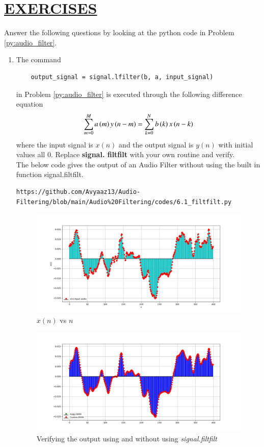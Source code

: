 \documentclass[journal,12pt,twocolumn]{IEEEtran}
\theoremstyle{remark}
\renewcommand\thesection{\arabic{section}}
\numberwithin{equation}{subsection}
\begin{document}
\section{\underline{\textbf{EXERCISES}}}
\noindent Answer the following questions by looking at the python code in Problem \ref{py:audio_filter}.
\begin{enumerate}[label=\thesection.\arabic*]
\item
The command
\begin{lstlisting}
	output_signal = signal.lfilter(b, a, input_signal)
	\end{lstlisting}
in Problem \ref{py:audio_filter} is executed through the following difference equation
\begin{equation}
\label{eq:iir_filter_gen}
 \sum _{m=0}^{M}a\left(m\right)y\left(n-m\right)=\sum _{k=0}^{N}b\left(k\right)x\left(n-k\right) 
\end{equation}
%
where the input signal is $x(n)$ and the output signal is $y(n)$ with initial values all 0. Replace
\textbf{signal. filtfilt} with your own routine and verify.\\

\solution The below code gives the output of an Audio Filter without using the built in function signal.filtfilt.

\begin{lstlisting}
https://github.com/Avyaaz13/Audio-Filtering/blob/main/Audio%20Filtering/codes/6.1_filtfilt.py
\end{lstlisting}
\begin{figure}[!ht]
\centering
\includegraphics[width=1.2\columnwidth]{figs/xn_custom.png}
\caption{$x(n)$ vs $n$}
\label{fig:x(n) vs n}
\end{figure}

\begin{figure}[!ht]
\centering
\includegraphics[width=1.2\columnwidth]{figs/Figure_1.png}
\caption{Verifying the output using and without using {\em signal.filtfilt}}
\label{fig:6.1}
\end{figure}


\end{enumerate}
\end{document}
